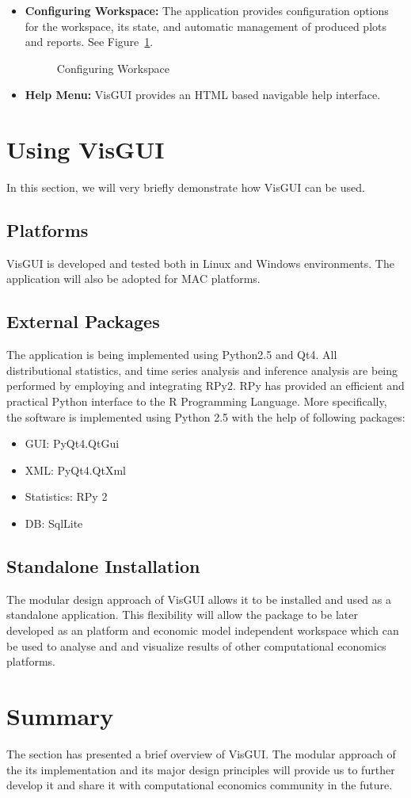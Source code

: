 \begin{itemize}
\item \textbf{Configuring Workspace:} The application provides configuration options for the workspace, its state, and automatic management of produced plots and reports. See Figure~\ref{figure:config}.
\begin{figure}[h]
  \centering
{}
  \caption{Configuring Workspace}
  \label{figure:config}
\end{figure}
\item \textbf{Help Menu:} VisGUI provides an HTML based navigable help interface. 
\end{itemize}

\section{Using VisGUI}
In this section, we will very briefly demonstrate how VisGUI can be used. 

\subsection{Platforms}
VisGUI is developed and tested both in Linux and Windows environments. The application will also be adopted for MAC platforms.
\subsection{External Packages}
The application is being implemented using Python2.5 and Qt4. All distributional statistics, and time series analysis and inference analysis are being performed by employing and integrating RPy2. RPy has provided an efficient and practical Python interface to the R Programming Language. More specifically, the software is implemented using Python 2.5 with the help of following packages:
\begin{itemize}
\item GUI: PyQt4.QtGui
\item XML: PyQt4.QtXml
\item Statistics: RPy 2
\item DB: SqlLite
\end{itemize}

\subsection{Standalone Installation}
The modular design approach of VisGUI allows it to be installed and used as a standalone application. This flexibility will allow the package to be later developed as an platform and economic model independent workspace which can be used to analyse and and visualize results of other computational economics platforms.

\section{Summary}
The section has presented a brief overview of VisGUI. The modular approach of the its implementation and its major design principles will provide us to further develop it and share it with computational economics community in the future.

